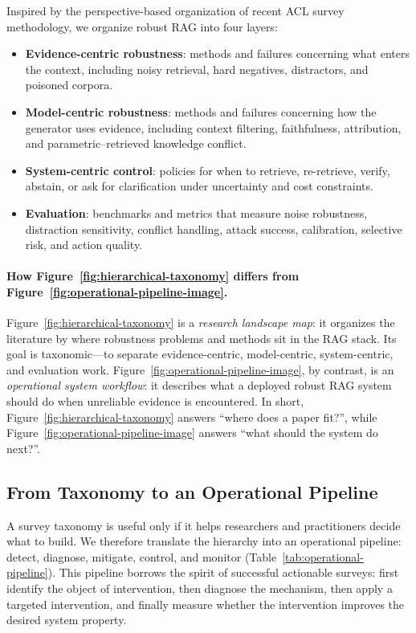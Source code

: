 \documentclass[11pt]{article}
\begin{document}
Inspired by the perspective-based organization of recent ACL survey methodology, we organize robust RAG into four layers:
\begin{itemize}[leftmargin=*]
    \item \textbf{Evidence-centric robustness}: methods and failures concerning what enters the context, including noisy retrieval, hard negatives, distractors, and poisoned corpora.
    \item \textbf{Model-centric robustness}: methods and failures concerning how the generator uses evidence, including context filtering, faithfulness, attribution, and parametric--retrieved knowledge conflict.
    \item \textbf{System-centric control}: policies for when to retrieve, re-retrieve, verify, abstain, or ask for clarification under uncertainty and cost constraints.
    \item \textbf{Evaluation}: benchmarks and metrics that measure noise robustness, distraction sensitivity, conflict handling, attack success, calibration, selective risk, and action quality.
\end{itemize}



\paragraph{How Figure~\ref{fig:hierarchical-taxonomy} differs from Figure~\ref{fig:operational-pipeline-image}.}
Figure~\ref{fig:hierarchical-taxonomy} is a \emph{research landscape map}: it organizes the literature by where robustness problems and methods sit in the RAG stack. Its goal is taxonomic---to separate evidence-centric, model-centric, system-centric, and evaluation work. Figure~\ref{fig:operational-pipeline-image}, by contrast, is an \emph{operational system workflow}: it describes what a deployed robust RAG system should do when unreliable evidence is encountered. In short, Figure~\ref{fig:hierarchical-taxonomy} answers ``where does a paper fit?'', while Figure~\ref{fig:operational-pipeline-image} answers ``what should the system do next?''.



\subsection{From Taxonomy to an Operational Pipeline}

A survey taxonomy is useful only if it helps researchers and practitioners decide what to build. We therefore translate the hierarchy into an operational pipeline: detect, diagnose, mitigate, control, and monitor (Table~\ref{tab:operational-pipeline}). This pipeline borrows the spirit of successful actionable surveys: first identify the object of intervention, then diagnose the mechanism, then apply a targeted intervention, and finally measure whether the intervention improves the desired system property.
\end{document}
